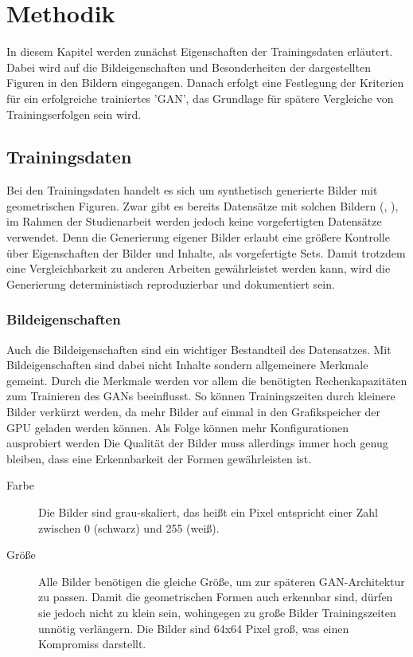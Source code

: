 \chapter{Methodik}
In diesem Kapitel werden zunächst Eigenschaften der Trainingsdaten erläutert.
Dabei wird auf die Bildeigenschaften und Besonderheiten der dargestellten Figuren in den Bildern eingegangen.
Danach erfolgt eine Festlegung der Kriterien für ein erfolgreiche trainiertes 'GAN', das Grundlage für spätere Vergleiche von Trainingserfolgen sein wird.

\section{Trainingsdaten}
Bei den Trainingsdaten handelt es sich um synthetisch generierte Bilder mit geometrischen Figuren.
Zwar gibt es bereits Datensätze mit solchen Bildern (\cite{dataset:four-shapes}, \cite{dataset:2d-geometric-shapes-dataset}), im Rahmen der Studienarbeit werden jedoch keine vorgefertigten Datensätze verwendet.
Denn die Generierung eigener Bilder erlaubt eine größere Kontrolle über Eigenschaften der Bilder und Inhalte, als vorgefertigte Sets.
Damit trotzdem eine Vergleichbarkeit zu anderen Arbeiten gewährleistet werden kann, wird die Generierung deterministisch reproduzierbar und dokumentiert sein.

\subsection{Bildeigenschaften}
Auch die Bildeigenschaften sind ein wichtiger Bestandteil des Datensatzes.
Mit Bildeigenschaften sind dabei nicht Inhalte sondern allgemeinere Merkmale gemeint.
Durch die Merkmale werden vor allem die benötigten Rechenkapazitäten zum Trainieren des GANs beeinflusst.
So können Trainingszeiten durch kleinere Bilder verkürzt werden, da mehr Bilder auf einmal in den Grafikspeicher der GPU geladen werden können.
Als Folge können mehr Konfigurationen ausprobiert werden
Die Qualität der Bilder muss allerdings immer hoch genug bleiben, dass eine Erkennbarkeit der Formen gewährleisten ist.

\begin{description}
	\item[Farbe]
	Die Bilder sind grau-skaliert, das heißt ein Pixel entspricht einer Zahl zwischen 0 (schwarz) und 255 (weiß).
	
	\item[Größe]
	Alle Bilder benötigen die gleiche Größe, um zur späteren GAN-Architektur zu passen.
	Damit die geometrischen Formen auch erkennbar sind, dürfen sie jedoch nicht zu klein sein, wohingegen zu große Bilder Trainingszeiten unnötig verlängern.
	Die Bilder sind 64x64 Pixel groß, was einen Kompromiss darstellt.
\end{description}

